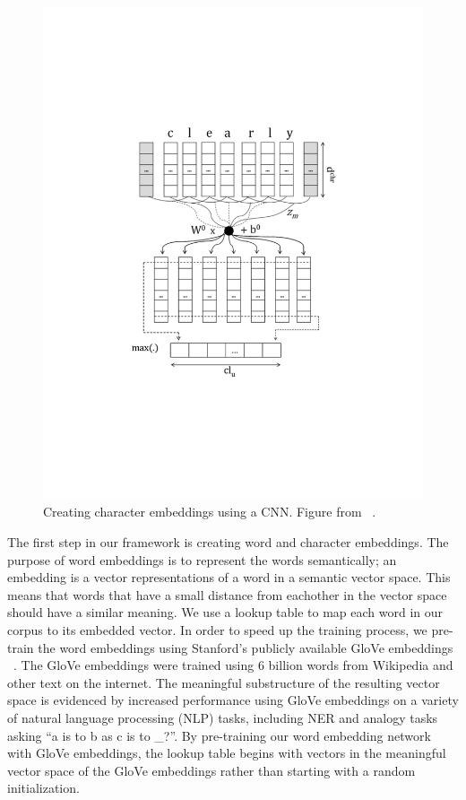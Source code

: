 \begin{figure}[h]
\begin{minipage}[t]{0.5\textwidth}
    	\includegraphics[width=.95\linewidth]{LatexDiss/figures/character-CNN.pdf}
    	\caption{Creating character embeddings using a CNN. Figure from ~\citep{characterembeddings}.}
    	\label{fig:CNN}
    \end{minipage}
\end{figure}

The first step in our framework is creating word and character embeddings. The purpose of word embeddings is to represent the words semantically; an embedding is a vector representations of a word in a semantic vector space. This means that words that have a small distance from eachother in the vector space should have a similar meaning. We use a lookup table to map each word in our corpus to its embedded vector. In order to speed up the training process, we pre-train the word embeddings using Stanford's publicly available GloVe embeddings ~\citep{Pennington2014GloveGV}. The GloVe embeddings were trained using 6 billion words from Wikipedia and other text on the internet. The meaningful substructure of the resulting  vector space is evidenced by increased performance using GloVe embeddings on a variety of natural language processing (NLP) tasks, including NER and analogy tasks asking ``a is to b as c is to \_?''. By pre-training our word embedding network with GloVe embeddings, the lookup table begins with vectors in the meaningful vector space of the GloVe embeddings rather than starting with a random initialization.

